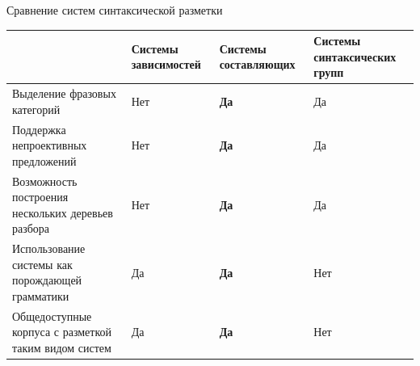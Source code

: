 \documentclass[8pt, aspectratio=169]{beamer}
\begin{document}
	\begin{frame}{\centering Сравнение систем синтаксической разметки}
		\setlength{\parindent}{.5cm}
			\centering
			\begin{tabular}{|p{}|p{.17\textwidth}|p{}|p{}|}
				\hline
				& Системы \newline зависимостей & \textbf{Системы \newline составляющих} & Системы \newline синтаксических групп\\\hline
				Выделение фразовых категорий & Нет & \textbf{Да}  & Да \\\hline
				Поддержка непроективных \newline предложений & Нет & \textbf{Да} &  Да \\\hline
				Возможность построения \newline нескольких деревьев разбора & Нет & \textbf{Да} & Да \\\hline
				Использование системы как \newline порождающей грамматики & Да & \textbf{Да} & Нет \\\hline
				Общедоступные корпуса с \newline разметкой таким видом систем & Да & \textbf{Да} & Нет \\\hline
			\end{tabular}
	\end{frame}
	
\end{document}
